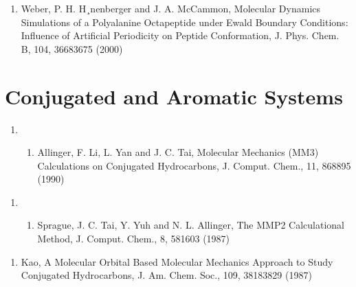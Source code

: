 \documentclass[letterpaper,11pt,english]{sphinxmanual}
\begin{document}
\begin{enumerate}
%
\setcounter{enumi}{22}
\item {} 
Weber, P. H. H¸nenberger and J. A. McCammon, Molecular Dynamics Simulations of a Polyalanine Octapeptide under Ewald Boundary Conditions: Influence of Artificial Periodicity on Peptide Conformation, J. Phys. Chem. B, 104, 3668\sphinxhyphen{}3675 (2000)

\end{enumerate}


\section{Conjugated and Aromatic Systems}
\label{\detokenize{text/references:conjugated-and-aromatic-systems}}\begin{enumerate}
%
\setcounter{enumi}{13}
\item {} \begin{enumerate}
%
\setcounter{enumii}{11}
\item {} 
Allinger, F. Li, L. Yan and J. C. Tai, Molecular Mechanics (MM3) Calculations on Conjugated Hydrocarbons, J. Comput. Chem., 11, 868\sphinxhyphen{}895 (1990)

\end{enumerate}

\end{enumerate}
\begin{enumerate}
%
\setcounter{enumi}{9}
\item {} \begin{enumerate}
%
\setcounter{enumii}{19}
\item {} 
Sprague, J. C. Tai, Y. Yuh and N. L. Allinger, The MMP2 Calculational Method, J. Comput. Chem., 8, 581\sphinxhyphen{}603 (1987)

\end{enumerate}

\end{enumerate}
\begin{enumerate}
%
\setcounter{enumi}{9}
\item {} 
Kao, A Molecular Orbital Based Molecular Mechanics Approach to Study Conjugated Hydrocarbons, J. Am. Chem. Soc., 109, 3818\sphinxhyphen{}3829 (1987)

\end{enumerate}
\end{document}
